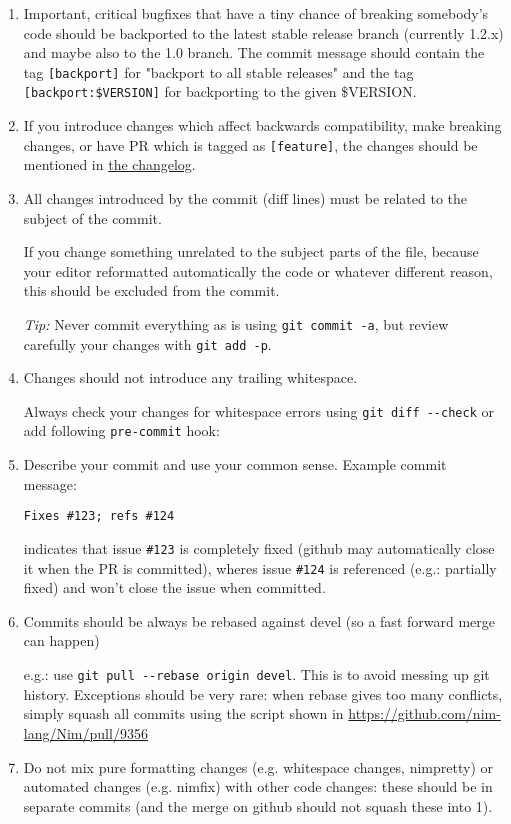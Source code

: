 \begin{enumerate}
\def\labelenumi{\arabic{enumi}.}
\item
  Important, critical bugfixes that have a tiny chance of breaking
  somebody's code should be backported to the latest stable release
  branch (currently 1.2.x) and maybe also to the 1.0 branch. The commit
  message should contain the tag \texttt{{[}backport{]}} for "backport
  to all stable releases" and the tag \texttt{{[}backport:\$VERSION{]}}
  for backporting to the given \$VERSION.
\item
  If you introduce changes which affect backwards compatibility, make
  breaking changes, or have PR which is tagged as
  \texttt{{[}feature{]}}, the changes should be mentioned in
  \href{https://github.com/nim-lang/Nim/blob/devel/changelog.md}{the
  changelog}.
\item
  All changes introduced by the commit (diff lines) must be related to
  the subject of the commit.

  If you change something unrelated to the subject parts of the file,
  because your editor reformatted automatically the code or whatever
  different reason, this should be excluded from the commit.

  \emph{Tip:} Never commit everything as is using
  \texttt{git\ commit\ -a}, but review carefully your changes with
  \texttt{git\ add\ -p}.
\item
  Changes should not introduce any trailing whitespace.

  Always check your changes for whitespace errors using
  \texttt{git\ diff\ -\/-check} or add following \texttt{pre-commit}
  hook:

\begin{Shaded}
\begin{Highlighting}[]
\KeywordTok{||}  
\end{Highlighting}
\end{Shaded}
\item
  Describe your commit and use your common sense. Example commit
  message:

  \texttt{Fixes\ \#123;\ refs\ \#124}

  indicates that issue \texttt{\#123} is completely fixed (github may
  automatically close it when the PR is committed), wheres issue
  \texttt{\#124} is referenced (e.g.: partially fixed) and won't close
  the issue when committed.
\item
  Commits should be always be rebased against devel (so a fast forward
  merge can happen)

  e.g.: use \texttt{git\ pull\ -\/-rebase\ origin\ devel}. This is to
  avoid messing up git history. Exceptions should be very rare: when
  rebase gives too many conflicts, simply squash all commits using the
  script shown in \url{https://github.com/nim-lang/Nim/pull/9356}
\item
  Do not mix pure formatting changes (e.g. whitespace changes,
  nimpretty) or automated changes (e.g. nimfix) with other code changes:
  these should be in separate commits (and the merge on github should
  not squash these into 1).
\end{enumerate}

